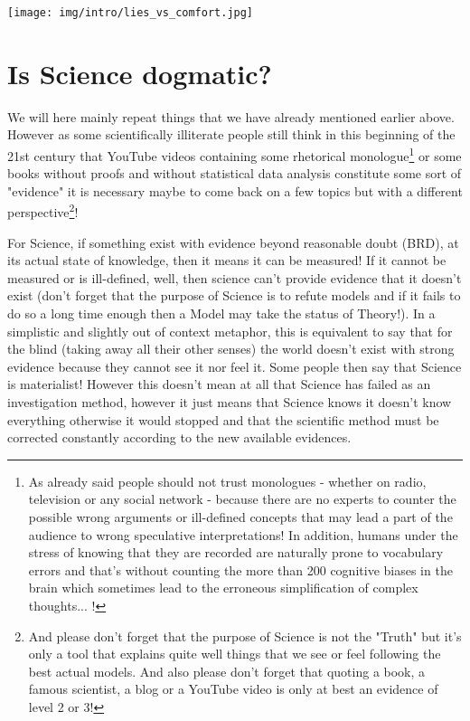 	\begin{center}
		\texttt{[image: img/intro/lies\_vs\_comfort.jpg]}	
	\end{center}
	
	\pagebreak
	\section{Is Science dogmatic?}
	We will here mainly repeat things that we have already mentioned earlier above. However as some scientifically illiterate people still think in this beginning of the 21st century that YouTube videos containing some rhetorical monologue\footnote{As already said people should not trust monologues - whether on radio, television or any social network - because there are no experts to counter the possible wrong arguments or ill-defined concepts that may lead a part of the audience to wrong speculative interpretations! In addition, humans under the stress of knowing that they are recorded are naturally prone to vocabulary errors and that's without counting the more than 200 cognitive biases in the brain which sometimes lead to the erroneous simplification of complex thoughts... !} or some books without proofs and without statistical data analysis constitute some sort of "evidence" it is necessary maybe to come back on a few topics but with a different perspective\footnote{And please don't forget that the purpose of Science is not the "Truth" but it's only a tool that explains quite well things that we see or feel following the best actual models. And also please don't forget that quoting a book, a famous scientist, a blog or a YouTube video is only at best an evidence of level 2 or 3!}!
	
	For Science, if something exist with evidence beyond reasonable doubt (BRD), at its actual state of knowledge, then it means it can be measured! If it cannot be measured or is ill-defined, well, then science can't provide evidence that it doesn't exist (don't forget that the purpose of Science is to refute models and if it fails to do so a long time enough then a Model may take the status of Theory!). In a simplistic and slightly out of context metaphor, this is equivalent to say that for the blind (taking away all their other senses) the world doesn't exist with strong evidence because they cannot see it nor feel it. Some people then say that Science is materialist! However this doesn't mean at all that Science has failed as an investigation method, however it just means that Science knows it doesn't know everything otherwise it would stopped and that the scientific method must be corrected constantly according to the new available evidences.
	
